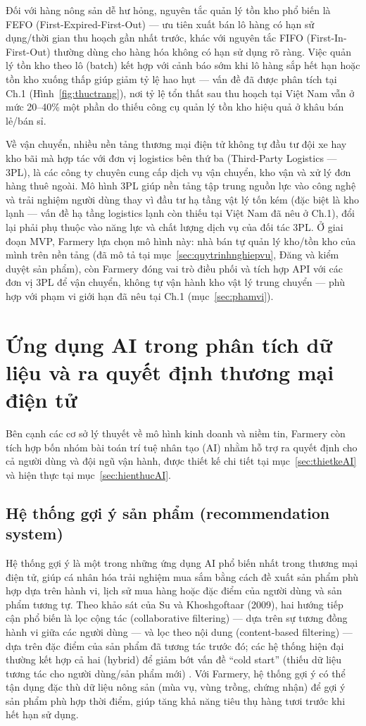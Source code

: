 Đối với hàng nông sản dễ hư hỏng, nguyên tắc quản lý tồn kho phổ biến là FEFO (First-Expired-First-Out) --- ưu tiên xuất bán lô hàng có hạn sử dụng/thời gian thu hoạch gần nhất trước, khác với nguyên tắc FIFO (First-In-First-Out) thường dùng cho hàng hóa không có hạn sử dụng rõ ràng. Việc quản lý tồn kho theo lô (batch) kết hợp với cảnh báo sớm khi lô hàng sắp hết hạn hoặc tồn kho xuống thấp giúp giảm tỷ lệ hao hụt --- vấn đề đã được phân tích tại Ch.1 (Hình~\ref{fig:thuctrang}), nơi tỷ lệ tổn thất sau thu hoạch tại Việt Nam vẫn ở mức 20--40\% một phần do thiếu công cụ quản lý tồn kho hiệu quả ở khâu bán lẻ/bán sỉ.

Về vận chuyển, nhiều nền tảng thương mại điện tử không tự đầu tư đội xe hay kho bãi mà hợp tác với đơn vị logistics bên thứ ba (Third-Party Logistics --- 3PL), là các công ty chuyên cung cấp dịch vụ vận chuyển, kho vận và xử lý đơn hàng thuê ngoài. Mô hình 3PL giúp nền tảng tập trung nguồn lực vào công nghệ và trải nghiệm người dùng thay vì đầu tư hạ tầng vật lý tốn kém (đặc biệt là kho lạnh --- vấn đề hạ tầng logistics lạnh còn thiếu tại Việt Nam đã nêu ở Ch.1), đổi lại phải phụ thuộc vào năng lực và chất lượng dịch vụ của đối tác 3PL. Ở giai đoạn MVP, Farmery lựa chọn mô hình này: nhà bán tự quản lý kho/tồn kho của mình trên nền tảng (đã mô tả tại mục~\ref{sec:quytrinhnghiepvu}, Đăng và kiểm duyệt sản phẩm), còn Farmery đóng vai trò điều phối và tích hợp API với các đơn vị 3PL để vận chuyển, không tự vận hành kho vật lý trung chuyển --- phù hợp với phạm vi giới hạn đã nêu tại Ch.1 (mục~\ref{sec:phamvi}).

\section{Ứng dụng AI trong phân tích dữ liệu và ra quyết định thương mại điện tử}

Bên cạnh các cơ sở lý thuyết về mô hình kinh doanh và niềm tin, Farmery còn tích hợp bốn nhóm bài toán trí tuệ nhân tạo (AI) nhằm hỗ trợ ra quyết định cho cả người dùng và đội ngũ vận hành, được thiết kế chi tiết tại mục~\ref{sec:thietkeAI} và hiện thực tại mục~\ref{sec:hienthucAI}.

\subsection{Hệ thống gợi ý sản phẩm (recommendation system)}
Hệ thống gợi ý là một trong những ứng dụng AI phổ biến nhất trong thương mại điện tử, giúp cá nhân hóa trải nghiệm mua sắm bằng cách đề xuất sản phẩm phù hợp dựa trên hành vi, lịch sử mua hàng hoặc đặc điểm của người dùng và sản phẩm tương tự. Theo khảo sát của Su và Khoshgoftaar (2009), hai hướng tiếp cận phổ biến là lọc cộng tác (collaborative filtering) --- dựa trên sự tương đồng hành vi giữa các người dùng --- và lọc theo nội dung (content-based filtering) --- dựa trên đặc điểm của sản phẩm đã tương tác trước đó; các hệ thống hiện đại thường kết hợp cả hai (hybrid) để giảm bớt vấn đề ``cold start'' (thiếu dữ liệu tương tác cho người dùng/sản phẩm mới) \cite{su2009collaborative}. Với Farmery, hệ thống gợi ý có thể tận dụng đặc thù dữ liệu nông sản (mùa vụ, vùng trồng, chứng nhận) để gợi ý sản phẩm phù hợp thời điểm, giúp tăng khả năng tiêu thụ hàng tươi trước khi hết hạn sử dụng.


